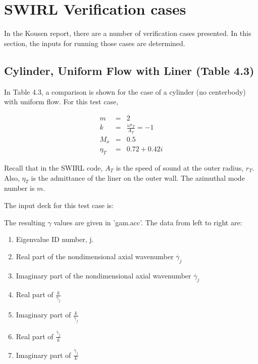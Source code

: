 \documentclass[12pt]{article}
\begin{document}
\section{SWIRL Verification cases}

In the Kousen report, there are a number of verification
cases presented.  In this section, the inputs for running
those cases are determined.

\subsection{Cylinder, Uniform Flow with Liner (Table 4.3)}

In Table 4.3, a comparison is shown for the case of a 
cylinder (no centerbody) with uniform flow.  For this
test case, 

\begin{eqnarray}
m &=& 2
\nonumber
\\
k &=& \frac{\omega r_T}{A_T} = -1
\nonumber
\\
M_x &=& 0.5
\nonumber
\\
\eta_T &=& 0.72 + 0.42 i
\nonumber
\end{eqnarray}

Recall that in the SWIRL code, $A_T$ is the speed of
sound at the outer radius, $r_T$.  Also, $\eta_T$ is the 
admittance of the liner on the outer wall.  The azimuthal
mode number is $m$.

The input deck for this test case is:

\begin{tiny}
\end{tiny}%

The resulting $\gamma$ values are given in 'gam.acc'.  The
data from left to right are:

\begin{enumerate}
\item{Eigenvalue ID number, j.}
\item{Real part of the nondimensional axial wavenumber $\overline{\gamma}_j$}
\item{Imaginary part of the nondimensional axial wavenumber $\overline{\gamma}_j$}
\item{Real part of $\frac{k}{\overline{\gamma}_j}$}
\item{Imaginary part of $\frac{k}{\overline{\gamma}_j}$}
\item{Real part of $\frac{\overline{\gamma}_j}{k}$}
\item{Imaginary part of $\frac{\overline{\gamma}_j}{k}$}
\end{enumerate}
\end{document}
